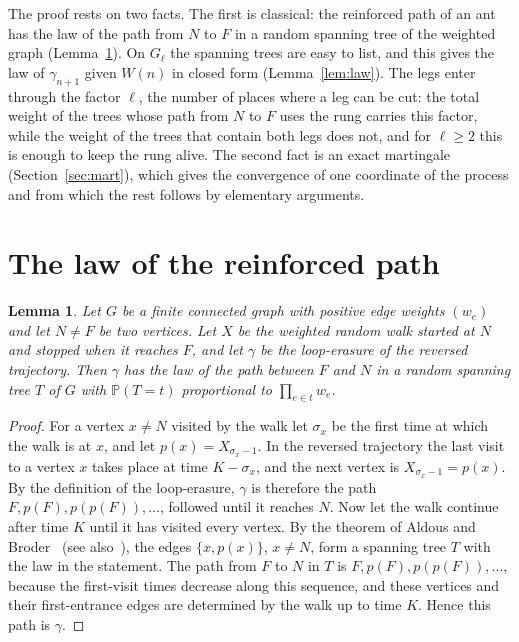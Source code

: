 \documentclass[11pt]{amsart}
\newtheorem{lemma}[theorem]{Lemma}
\theoremstyle{remark}
\newcommand{\PP}{\mathbb{P}}
\begin{document}
The proof rests on two facts. The first is classical: the reinforced path of an ant has the law of the path from $N$
to $F$ in a random spanning tree of the weighted graph (Lemma~\ref{lem:ust}). On $G_\ell$ the spanning trees are easy
to list, and this gives the law of $\gamma_{n+1}$ given $W(n)$ in closed form (Lemma~\ref{lem:law}). The legs enter
through the factor $\ell$, the number of places where a leg can be cut: the total weight of the trees whose path from
$N$ to $F$ uses the rung carries this factor, while the weight of the trees that contain both legs does not, and for
$\ell\ge2$ this is enough to keep the rung alive. The second fact is an exact martingale (Section~\ref{sec:mart}), which gives the
convergence of one coordinate of the process and from which the rest follows by elementary arguments.

\section{The law of the reinforced path}

\begin{lemma}\label{lem:ust}
Let $G$ be a finite connected graph with positive edge weights $(w_e)$ and let $N\ne F$ be two vertices. Let $X$ be
the weighted random walk started at $N$ and stopped when it reaches $F$, and let $\gamma$ be the loop-erasure of the
reversed trajectory. Then $\gamma$ has the law of the path between $F$ and $N$ in a random spanning tree $T$ of $G$
with $\PP(T=t)$ proportional to $\prod_{e\in t}w_e$.
\end{lemma}
\begin{proof}
For a vertex $x\ne N$ visited by the walk let $\sigma_x$ be the first time at which the walk is at $x$, and let
$p(x)=X_{\sigma_x-1}$. In the reversed trajectory the last visit to a vertex $x$ takes place at time $K-\sigma_x$, and
the next vertex is $X_{\sigma_x-1}=p(x)$. By the definition of the loop-erasure, $\gamma$ is therefore the path
$F,p(F),p(p(F)),\dots$, followed until it reaches $N$. Now let the walk continue after time $K$ until it has visited
every vertex. By the theorem of Aldous and Broder~\cite{Aldous,Broder} (see also~\cite[Chapter~4]{LP}), the edges
$\{x,p(x)\}$, $x\ne N$, form a spanning tree $T$ with the law in the statement. The path from $F$ to $N$ in $T$ is
$F,p(F),p(p(F)),\dots$, because the first-visit times decrease along this sequence, and these vertices and their
first-entrance edges are determined by the walk up to time $K$. Hence this path is $\gamma$.
\end{proof}
\end{document}
